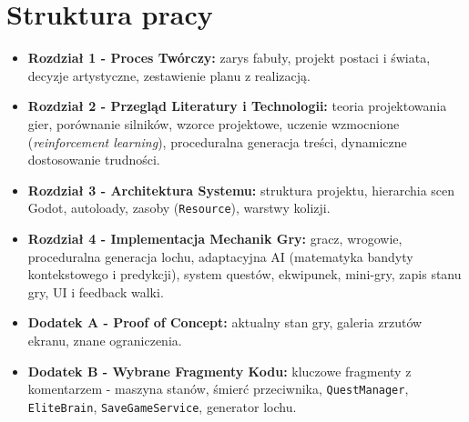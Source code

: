 \section{Struktura pracy}

\begin{itemize}
    \item \textbf{Rozdział 1 - Proces Twórczy:} zarys fabuły, projekt postaci i świata, decyzje artystyczne, zestawienie planu z realizacją.
    \item \textbf{Rozdział 2 - Przegląd Literatury i Technologii:} teoria projektowania gier, porównanie silników, wzorce projektowe, uczenie wzmocnione (\textit{reinforcement learning}), proceduralna generacja treści, dynamiczne dostosowanie trudności.
    \item \textbf{Rozdział 3 - Architektura Systemu:} struktura projektu, hierarchia scen Godot, autoloady, zasoby (\texttt{Resource}), warstwy kolizji.
    \item \textbf{Rozdział 4 - Implementacja Mechanik Gry:} gracz, wrogowie, proceduralna generacja lochu, adaptacyjna AI (matematyka bandyty kontekstowego i predykcji), system questów, ekwipunek, mini-gry, zapis stanu gry, UI i feedback walki.
    \item \textbf{Dodatek A - Proof of Concept:} aktualny stan gry, galeria zrzutów ekranu, znane ograniczenia.
    \item \textbf{Dodatek B - Wybrane Fragmenty Kodu:} kluczowe fragmenty z komentarzem - maszyna stanów, śmierć przeciwnika, \texttt{QuestManager}, \texttt{EliteBrain}, \texttt{SaveGameService}, generator lochu.
\end{itemize}
